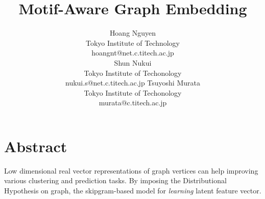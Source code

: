 \documentclass[letterpaper]{article}
\title{Motif-Aware Graph Embedding}
\author{
    Hoang Nguyen \\
    Tokyo Institute of Technology \\
    hoangnt@net.c.titech.ac.jp \\
    \And 
    Shun Nukui \\ 
    Tokyo Institute of Techonology \\
    nukui.s@net.c.titech.ac.jp 
    \And 
    Tsuyoshi Murata \\
    Tokyo Institute of Techonology \\
    murata@c.titech.ac.jp 
}
\begin{document}
    \maketitle

    \section{Abstract}
        Low dimensional real vector representations of graph vertices can help
        improving various clustering and prediction tasks. By imposing the Distributional
        Hypothesis on graph, the skipgram-based model for \emph{learning} latent
        feature vector.
        
\end{document}
